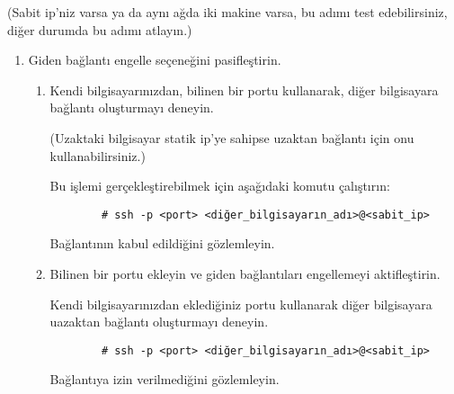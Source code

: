 \documentclass[a4paper,10pt]{article}
\begin{document}
\begin{enumerate}
\begin{enumerate}
	(Sabit ip'niz varsa ya da aynı ağda iki makine varsa, bu adımı test edebilirsiniz, diğer durumda bu adımı atlayın.)

        \begin{enumerate}
        \item Giden bağlantı engelle seçeneğini pasifleştirin.
            \begin{enumerate}
            \item Kendi bilgisayarınızdan, bilinen bir portu kullanarak, diğer bilgisayara bağlantı oluşturmayı deneyin.

                (Uzaktaki bilgisayar statik ip'ye sahipse uzaktan bağlantı için onu kullanabilirsiniz.)

                Bu işlemi gerçekleştirebilmek için aşağıdaki komutu çalıştırın:
		\begin{verbatim}
		# ssh -p <port> <diğer_bilgisayarın_adı>@<sabit_ip>
		\end{verbatim} 
                Bağlantının kabul edildiğini gözlemleyin.

            \item Bilinen bir portu ekleyin ve giden bağlantıları engellemeyi aktifleştirin.
            	
            Kendi bilgisayarınızdan eklediğiniz portu kullanarak diğer bilgisayara uazaktan bağlantı oluşturmayı deneyin.
		\begin{verbatim}
		# ssh -p <port> <diğer_bilgisayarın_adı>@<sabit_ip>
		\end{verbatim}

                    Bağlantıya izin verilmediğini gözlemleyin. 
            \end{enumerate}
        \end{enumerate}
    \end{enumerate}
\end{enumerate}
\end{document}
